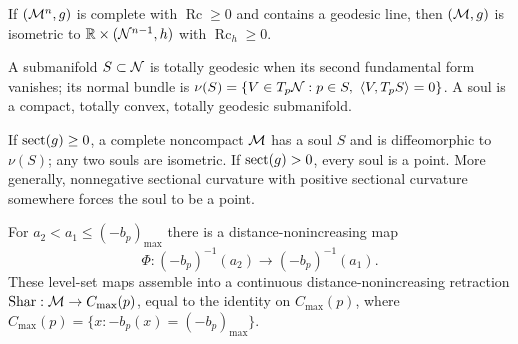 \begin{theorem}
\label{thm:chow-iii-i18-splitting}

If $(\mathcal M^n,g)$ is complete with $\operatorname{Rc}\ge0$ and contains a geodesic
line, then $(\mathcal M,g)$ is isometric to $\mathbb R\times(\mathcal N^{n-1},h)$ with
$\operatorname{Rc}_h\ge0$.
\end{theorem}

\begin{definition}[Soul]
\label{def:chow-iii-i20-i21-soul}
A submanifold $S\subset\mathcal N$ is totally geodesic when its second fundamental
form vanishes; its normal bundle is
$\nu(S)=\{V\in T_p\mathcal N:p\in S,\ \langle V,T_pS\rangle=0\}$.  A soul is a
compact, totally convex, totally geodesic submanifold.
\end{definition}

\begin{theorem}
\label{thm:chow-iii-i22-i23-soul}

If $\operatorname{sect}(g)\ge0$, a complete noncompact $\mathcal M$ has a soul $S$ and is
diffeomorphic to $\nu(S)$; any two souls are isometric.  If $\operatorname{sect}(g)>0$,
every soul is a point.  More generally, nonnegative sectional curvature with
positive sectional curvature somewhere forces the soul to be a point.
\end{theorem}

\begin{theorem}
\label{thm:chow-iii-i24-i25-sharafutdinov}

For $a_2<a_1\le(-b_p)_{\max}$ there is a distance-nonincreasing map
\[
\Phi:(-b_p)^{-1}(a_2)\longrightarrow(-b_p)^{-1}(a_1).
\]
These level-set maps assemble into a continuous distance-nonincreasing
retraction $\operatorname{Shar}:\mathcal M\to C_{\max}(p)$, equal to the identity on $C_{\max}(p)$,
where $C_{\max}(p)=\{x:-b_p(x)=(-b_p)_{\max}\}$.
\end{theorem}

